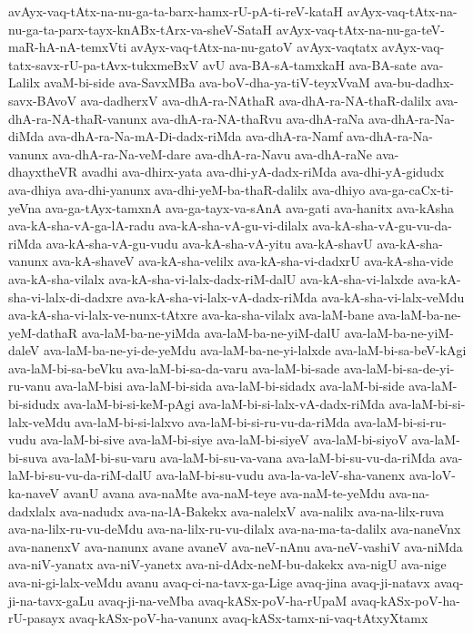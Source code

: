 {avAyx-vaq-tAtx-na-nu-ga-ta-barx-hamx-rU-pA-ti-reV-kataH
avAyx-vaq-tAtx-na-nu-ga-ta-parx-tayx-knABx-tArx-va-sheV-SataH
avAyx-vaq-tAtx-na-nu-ga-teV-maR-hA-nA-temxVti
avAyx-vaq-tAtx-na-nu-gatoV
avAyx-vaqtatx
avAyx-vaq-tatx-savx-rU-pa-tAvx-tukxmeBxV
avU
ava-BA-sA-tamxkaH
ava-BA-sate
ava-Lalilx
avaM-bi-side
ava-SavxMBa
ava-boV-dha-ya-tiV-teyxVvaM
ava-bu-dadhx-savx-BAvoV
ava-dadherxV
ava-dhA-ra-NAthaR
ava-dhA-ra-NA-thaR-dalilx
ava-dhA-ra-NA-thaR-vanunx
ava-dhA-ra-NA-thaRvu
ava-dhA-raNa
ava-dhA-ra-Na-diMda
ava-dhA-ra-Na-mA-Di-dadx-riMda
ava-dhA-ra-Namf
ava-dhA-ra-Na-vanunx
ava-dhA-ra-Na-veM-dare
ava-dhA-ra-Navu
ava-dhA-raNe
ava-dhayxtheVR
avadhi
ava-dhirx-yata
ava-dhi-yA-dadx-riMda
ava-dhi-yA-gidudx
ava-dhiya
ava-dhi-yanunx
ava-dhi-yeM-ba-thaR-dalilx
ava-dhiyo
ava-ga-caCx-ti-yeVna
ava-ga-tAyx-tamxnA
ava-ga-tayx-va-sAnA
ava-gati
ava-hanitx
ava-kAsha
ava-kA-sha-vA-ga-lA-radu
ava-kA-sha-vA-gu-vi-dilalx
ava-kA-sha-vA-gu-vu-da-riMda
ava-kA-sha-vA-gu-vudu
ava-kA-sha-vA-yitu
ava-kA-shavU
ava-kA-sha-vanunx
ava-kA-shaveV
ava-kA-sha-velilx
ava-kA-sha-vi-dadxrU
ava-kA-sha-vide
ava-kA-sha-vilalx
ava-kA-sha-vi-lalx-dadx-riM-dalU
ava-kA-sha-vi-lalxde
ava-kA-sha-vi-lalx-di-dadxre
ava-kA-sha-vi-lalx-vA-dadx-riMda
ava-kA-sha-vi-lalx-veMdu
ava-kA-sha-vi-lalx-ve-nunx-tAtxre
ava-ka-sha-vilalx
ava-laM-bane
ava-laM-ba-ne-yeM-dathaR
ava-laM-ba-ne-yiMda
ava-laM-ba-ne-yiM-dalU
ava-laM-ba-ne-yiM-daleV
ava-laM-ba-ne-yi-de-yeMdu
ava-laM-ba-ne-yi-lalxde
ava-laM-bi-sa-beV-kAgi
ava-laM-bi-sa-beVku
ava-laM-bi-sa-da-varu
ava-laM-bi-sade
ava-laM-bi-sa-de-yi-ru-vanu
ava-laM-bisi
ava-laM-bi-sida
ava-laM-bi-sidadx
ava-laM-bi-side
ava-laM-bi-sidudx
ava-laM-bi-si-keM-pAgi
ava-laM-bi-si-lalx-vA-dadx-riMda
ava-laM-bi-si-lalx-veMdu
ava-laM-bi-si-lalxvo
ava-laM-bi-si-ru-vu-da-riMda
ava-laM-bi-si-ru-vudu
ava-laM-bi-sive
ava-laM-bi-siye
ava-laM-bi-siyeV
ava-laM-bi-siyoV
ava-laM-bi-suva
ava-laM-bi-su-varu
ava-laM-bi-su-va-vana
ava-laM-bi-su-vu-da-riMda
ava-laM-bi-su-vu-da-riM-dalU
ava-laM-bi-su-vudu
ava-la-va-leV-sha-vanenx
ava-loV-ka-naveV
avanU
avana
ava-naMte
ava-naM-teye
ava-naM-te-yeMdu
ava-na-dadxlalx
ava-nadudx
ava-na-lA-Bakekx
ava-nalelxV
ava-nalilx
ava-na-lilx-ruva
ava-na-lilx-ru-vu-deMdu
ava-na-lilx-ru-vu-dilalx
ava-na-ma-ta-dalilx
ava-naneVnx
ava-nanenxV
ava-nanunx
avane
avaneV
ava-neV-nAnu
ava-neV-vashiV
ava-niMda
ava-niV-yanatx
ava-niV-yanetx
ava-ni-dAdx-neM-bu-dakekx
ava-nigU
ava-nige
ava-ni-gi-lalx-veMdu
avanu
avaq-ci-na-tavx-ga-Lige
avaq-jina
avaq-ji-natavx
avaq-ji-na-tavx-gaLu
avaq-ji-na-veMba
avaq-kASx-poV-ha-rUpaM
avaq-kASx-poV-ha-rU-pasayx
avaq-kASx-poV-ha-vanunx
avaq-kASx-tamx-ni-vaq-tAtxyXtamx
}
